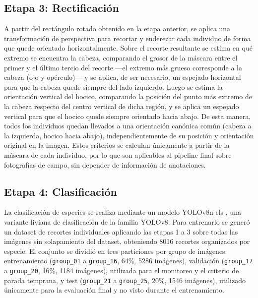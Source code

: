 \documentclass[conference]{IEEEtran}
\begin{document}
\subsection{Etapa 3: Rectificación}
A partir del rectángulo rotado obtenido en la etapa anterior, se aplica una transformación de perspectiva para recortar y enderezar cada individuo de forma que quede orientado horizontalmente. Sobre el recorte resultante se estima en qué extremo se encuentra la cabeza, comparando el grosor de la máscara entre el primer y el último tercio del recorte —el extremo más grueso corresponde a la cabeza (ojo y opérculo)— y se aplica, de ser necesario, un espejado horizontal para que la cabeza quede siempre del lado izquierdo. Luego se estima la orientación vertical del hocico, comparando la posición del punto más extremo de la cabeza respecto del centro vertical de dicha región, y se aplica un espejado vertical para que el hocico quede siempre orientado hacia abajo. De esta manera, todos los individuos quedan llevados a una orientación canónica común (cabeza a la izquierda, hocico hacia abajo), independientemente de su posición y orientación original en la imagen. Estos criterios se calculan únicamente a partir de la máscara de cada individuo, por lo que son aplicables al pipeline final sobre fotografías de campo, sin depender de información de anotaciones.

\subsection{Etapa 4: Clasificación}
La clasificación de especies se realiza mediante un modelo YOLOv8n-cls \cite{b2}, una variante liviana de clasificación de la familia YOLOv8. Para entrenarlo se generó un dataset de recortes individuales aplicando las etapas 1 a 3 sobre todas las imágenes sin solapamiento del dataset, obteniendo 8016 recortes organizados por especie. El conjunto se dividió en tres particiones por grupo de imágenes: entrenamiento (\texttt{group\_01} a \texttt{group\_16}, 64\%, 5286 imágenes), validación (\texttt{group\_17} a \texttt{group\_20}, 16\%, 1184 imágenes), utilizada para el monitoreo y el criterio de parada temprana, y test (\texttt{group\_21} a \texttt{group\_25}, 20\%, 1546 imágenes), utilizado únicamente para la evaluación final y no visto durante el entrenamiento.
\end{document}
